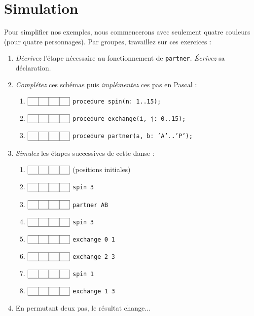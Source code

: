 \documentclass[11pt,a4paper,oneside]{book}
\begin{document}
\chapter{Simulation}\label{ch:sim}
Pour simplifier nos exemples, nous commencerons avec seulement quatre couleurs
(pour quatre personnages).
\newcommand{\boxes}{
	$\begin{array}{|l|l|l|l|}\hline
	\phantom{a} & \phantom{a} & \phantom{a} & \phantom{a} \\ \hline
	\end{array}$
}
Par groupes, travaillez sur ces exercices :
\begin{enumerate}
\item \emph{Décrivez} l'étape nécessaire au fonctionnement de \texttt{partner}.
	\emph{Écrivez} sa déclaration.
\item \emph{Complétez} ces schémas puis \emph{implémentez} ces pas en Pascal :
	\begin{enumerate}
	\item \boxes \texttt{procedure spin(n: 1..15);}
	\item \boxes \texttt{procedure exchange(i, j: 0..15);}
	\item \boxes \texttt{procedure partner(a, b: 'A'..'P');}
	\end{enumerate}
\item \emph{Simulez} les étapes successives de cette danse :
	\begin{enumerate}
	\item \boxes (positions initiales)
	\item \boxes \texttt{spin 3}
	\item \boxes \texttt{partner AB}
	\item \boxes \texttt{spin 3}
	\item \boxes \texttt{exchange 0 1}
	\item \boxes \texttt{exchange 2 3}
	\item \boxes \texttt{spin 1}
	\item \boxes \texttt{exchange 1 3} \label{sim:last}
	\end{enumerate}
\item En permutant deux pas, le résultat change...

\end{enumerate}
\end{document}
